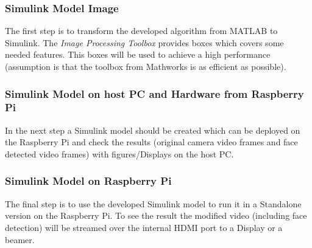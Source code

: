 \documentclass[Bachelorarbeit.tex]{subfiles}
\begin{document}
\subsubsection{Simulink Model Image}
The first step is to transform the developed algorithm from MATLAB to Simulink. The \textit{Image Processing Toolbox} provides boxes which covers some needed features. This boxes will be used to achieve a high performance (assumption is that the toolbox from Mathworks is as efficient as possible). 

\subsubsection{Simulink Model on host PC and Hardware from Raspberry Pi}
In the next step a Simulink model should be created which can be deployed on the Raspberry Pi and check the results (original camera video frames and face detected video frames) with figures/Displays on the host PC.

\subsubsection{Simulink Model on Raspberry Pi}
The final step is to use the developed Simulink model to run it in a Standalone version on the Raspberry Pi. To see the result the modified video (including face detection) will be streamed over the internal HDMI port to a Display or a beamer. 
\end{document}
